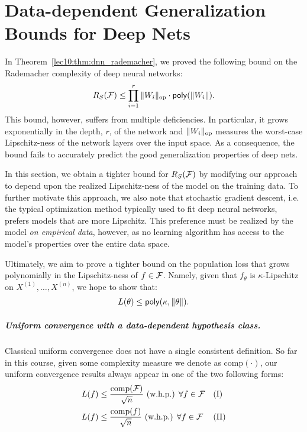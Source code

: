 \chapter{Data-dependent Generalization Bounds for Deep Nets}\label{sec:deep_nets_data_dependent}

In Theorem~\ref{lec10:thm:dnn_rademacher}, we proved the following bound on the Rademacher complexity of deep neural networks:
\begin{align}
    R_S(\mathcal F) \leq \prod_{i = 1}^r \|W_i\|_{\text{op}} \cdot \mathsf{poly}(\|W_i\|).
\end{align}
This bound, however, suffers from multiple deficiencies. In particular, it grows exponentially in the depth, $r$, of the network and $\|W_i\|_{\text{op}}$ measures the worst-case Lipschitz-ness of the network layers over the input space. As a consequence, the bound fails to accurately predict the good generalization properties of deep nets.

In this section, we obtain a tighter bound for $R_S(\mathcal F)$ by modifying our approach to depend upon the realized Lipschitz-ness of the model on the training data. To further motivate this approach, we also note that stochastic gradient descent, i.e. the typical optimization method typically used to fit deep neural networks, prefers models that are more Lipschitz. This preference must be realized by the model \emph{on empirical data}, however, as no learning algorithm has access to the model's properties over the entire data space.

Ultimately, we aim to prove a tighter bound on the population loss that grows polynomially in the Lipschitz-ness of $f \in \mathcal F$. Namely, given that $f_\theta$ is $\kappa$-Lipschitz on $X^{(1)},\dots,X^{(n)}$, we hope to show that:
\begin{align}
    L(\theta) \leq \mathsf{poly} (\kappa, \|\theta\|).
\end{align}

\paragraph{Uniform convergence with a data-dependent hypothesis class.}
Classical uniform convergence does not have a single consistent definition. So far in this course, given some complexity measure we denote as $\text{comp}(\cdot)$, our uniform convergence results always appear in one of the two following forms: 
\begin{align}
    L(f) &\leq \frac{\text{comp}(\mathcal F)}{\sqrt{n}} \text{ (w.h.p.) $\forall f \in \mathcal F$} &&\text{(I)} \\
    L(f) &\leq \frac{\text{comp}(f)}{\sqrt{n}} \text{ (w.h.p.) $\forall f \in \mathcal F$} &&\text{(II)}
\end{align}

